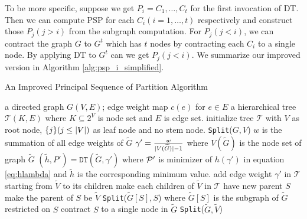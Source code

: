 \documentclass[runningheads]{llncs}
\begin{document}
To be more specific, suppose we get $P_i = {C_1, \dots, C_t}$ for the first invocation of DT. Then we can compute PSP for each $C_i(i=1,\dots, t)$ respectively and construct those $P_j(j>i)$ from the subgraph computation. For $P_j(j<i)$, we can contract the graph $G$  to $G^t$ which has $t$ nodes by contracting each $C_i$ to a single node. By applying DT to $G^t$ can we get $P_j(j<i)$. We summarize our improved version in Algorithm \ref{alg:psp_i_simplified}.

\begin{algorithm}
	\caption{An Improved Principal Sequence of Partition Algorithm}\label{alg:psp_i_simplified}
	\begin{algorithmic}[1]
		\REQUIRE a directed graph $G(V, E)$; edge weight map $c(e)$ for $e\in E$
		\ENSURE a hierarchical tree $\mathcal{T}(K, E)$ where $K \subseteq 2^{V}$ is node set and $E$ is edge set.
		\STATE initialize tree $\mathcal{T}$ with $V$ as root node, $\{j\}(j\leq \abs{V})$ as leaf node and no stem node.
		\STATE \texttt{Split}($G, V$)
		\STATE $w$ is the summation of all edge weights of $\widetilde{G}$ 
		\STATE $\gamma' = \frac{w}{\abs{V(\widetilde{G})}-1}$ where $V(\widetilde{G})$ is the node set of graph $\widetilde{G}$ \label{alg:gamma_apostrophe}
		\STATE $(\tilde{h}, P') = \texttt{DT}(\widetilde{G}, \gamma')$ where $\P'$ is minimizer of $h(\gamma')$ in equation \eqref{eq:hlambda} and $\tilde{h}$ is the corresponding minimum value.  \label{alg:DT}
		\STATE add edge weight $\gamma'$ in $\mathcal{T}$ starting from $\widetilde{V}$ to its children
		\ELSE
		\STATE make each children of $\widetilde{V}$ in $\mathcal{T}$ have new parent $S$		
		\STATE make the parent of $S$ be $\widetilde{V}$
		\STATE \texttt{Split}($\widetilde{G}[S], S$) where $\widetilde{G}[S]$ is the subgraph of $\widetilde{G}$ restricted on $S$
		\STATE contract $S$ to a single node in $\widetilde{G}$ %
		\ENDFOR 
		\STATE \texttt{Split}($\widetilde{G}, \widetilde{V}$)		
		\ENDIF
		\ENDFUNCTION
	\end{algorithmic}
\end{algorithm}
	
	
	
\end{document}
